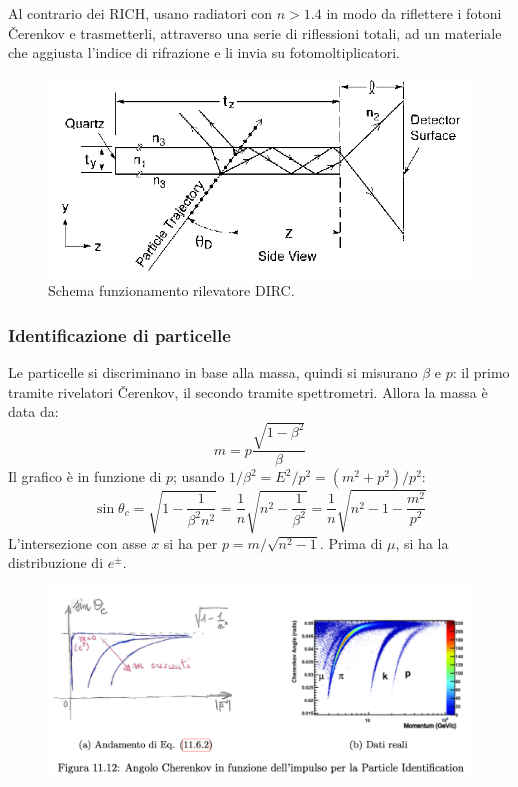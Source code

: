\documentclass[10pt, a4paper]{scrartcl}
\numberwithin{equation}{subsection}
\theoremstyle{style1}
\begin{document}
\begin{itemize}
		Al contrario dei RICH, usano radiatori con $n>1.4$ in modo da riflettere i fotoni \v Cerenkov e trasmetterli, attraverso una serie di riflessioni totali, ad un materiale che aggiusta l'indice di rifrazione e li invia su fotomoltiplicatori.
		\begin{figure}[h!]
			\centering
			\includegraphics[width=\columnwidth]{dirc.png}
			\caption{Schema funzionamento rilevatore DIRC.}
		\end{figure}
\end{itemize}
\subsubsection{Identificazione di particelle}
Le particelle si discriminano in base alla massa, quindi si misurano $\beta $ e $p$: il primo tramite rivelatori \v Cerenkov, il secondo tramite spettrometri. Allora la massa \`e data da:
\begin{equation}
	m = p \frac{\sqrt{ 1- \beta ^2} }{\beta }
\end{equation}
Il grafico \`e in funzione di $p$; usando $1/\beta ^2 = E^2 / p^2 = (m^2 + p^2)/p^2$:
\begin{equation}
\sin \theta _c = \sqrt{1- \frac{1}{\beta ^2 n ^2}} = \frac{1}{n} \sqrt{n^2 - \frac{1}{\beta ^2}} = \frac{1}{n} \sqrt{n^2 - 1- \frac{m^2 }{p^2}} 
\end{equation}
L'intersezione con asse $x$ si ha per $p = m / \sqrt{n^2 - 1} $. Prima di $\mu $, si ha la distribuzione di $e^{\pm} $.
\begin{figure}[h!]
	\centering
	\includegraphics[width=.8\columnwidth]{pid.png}
\end{figure}
\end{document}
